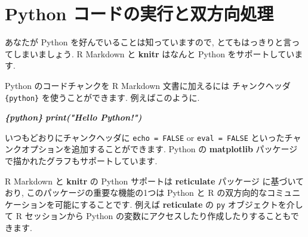 \documentclass[
  11pt,
  lualatex,ja=standard,jafont=noto]{bxjsreport}
\newenvironment{Shaded}{\begin{snugshade}}{\end{snugshade}}
\newcommand{\InformationTok}[1]{\textcolor[rgb]{0.56,0.35,0.01}{\textbf{\textit{#1}}}}
\begin{document}
\hypertarget{eng-python}{%
\section{Python コードの実行と双方向処理}\label{eng-python}}

あなたが Python を好んでいることは知っていますので, とてもはっきりと言ってしまいましょう. R Markdown と \textbf{knitr} はなんと Python をサポートしています.

Python のコードチャンクを R Markdown 文書に加えるには チャンクヘッダ \texttt{\textasciigrave{}\textasciigrave{}\textasciigrave{}\{python\}} を使うことができます. 例えばこのように.

\begin{Shaded}
\begin{Highlighting}[]
\InformationTok{\textasciigrave{}\textasciigrave{}\textasciigrave{}\{python\}}
\InformationTok{print("Hello Python!")}
\InformationTok{\textasciigrave{}\textasciigrave{}\textasciigrave{}}
\end{Highlighting}
\end{Shaded}

いつもどおりにチャンクヘッダに \texttt{echo = FALSE} or \texttt{eval = FALSE} といったチャンクオプションを追加することができます. Python の \textbf{matplotlib} パッケージで描かれたグラフもサポートしています.

R Markdown と \textbf{knitr} の Python サポートは \textbf{reticulate} パッケージ \autocite{R-reticulate} に基づいており, このパッケージの重要な機能の1つは Python と R の双方向的なコミュニケーションを可能にすることです. 例えば \textbf{reticulate} の \texttt{py} オブジェクトを介して R セッションから Python の変数にアクセスしたり作成したりすることもできます.
\end{document}
